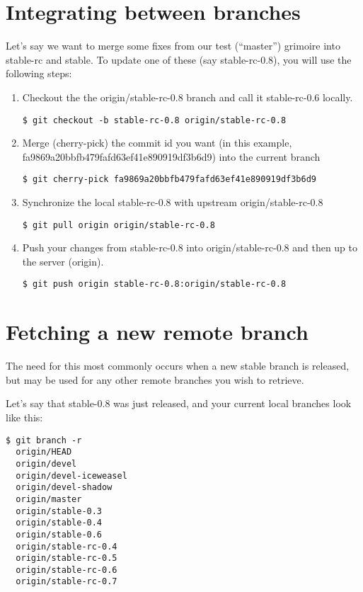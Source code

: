 \documentclass[a4paper,10pt]{book}
\begin{document}
\section{Integrating between branches}
Let's say we want to merge some fixes from our test (``master'') grimoire into
stable-rc and stable. To update one of these (say stable-rc-0.8), you will use
the following steps:
\begin{enumerate}
\item Checkout the the origin/stable-rc-0.8 branch and call it stable-rc-0.6
locally.
\begin{verbatim}
$ git checkout -b stable-rc-0.8 origin/stable-rc-0.8
\end{verbatim}
\item Merge (cherry-pick) the commit id you want (in this example,
fa9869a20bbfb479fafd63ef41e890919df3b6d9) into the current branch
\begin{verbatim}
$ git cherry-pick fa9869a20bbfb479fafd63ef41e890919df3b6d9
\end{verbatim}
\item Synchronize the local stable-rc-0.8 with upstream origin/stable-rc-0.8
\begin{verbatim}
$ git pull origin origin/stable-rc-0.8
\end{verbatim}
\item Push your changes from stable-rc-0.8 into origin/stable-rc-0.8 and then
up to the server (origin).
\begin{verbatim}
$ git push origin stable-rc-0.8:origin/stable-rc-0.8
\end{verbatim}
\end{enumerate}

\section{Fetching a new remote branch}
The need for this most commonly occurs when a new stable branch is released,
but may be used for any other remote branches you wish to retrieve.

Let's say that stable-0.8 was just released, and your current local branches
look like this:
\begin{verbatim}
$ git branch -r
  origin/HEAD
  origin/devel
  origin/devel-iceweasel
  origin/devel-shadow
  origin/master
  origin/stable-0.3
  origin/stable-0.4
  origin/stable-0.6
  origin/stable-rc-0.4
  origin/stable-rc-0.5
  origin/stable-rc-0.6
  origin/stable-rc-0.7
\end{verbatim}
\end{document}
